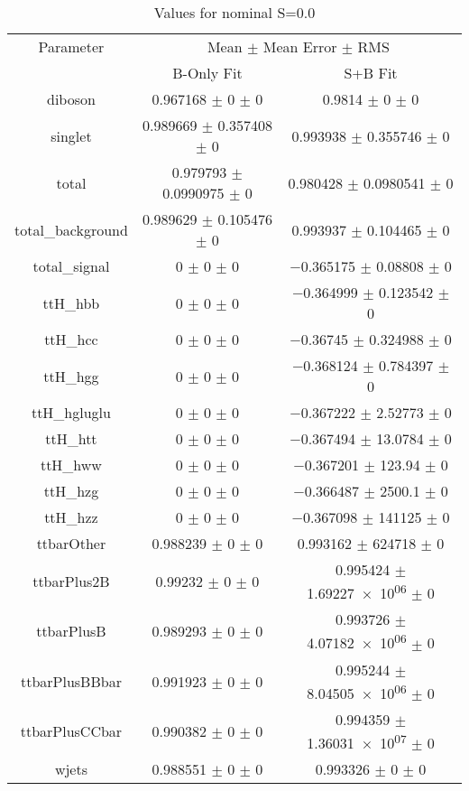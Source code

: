 \begin{table}
\centering
\caption{Values for nominal S=0.0}
\begin{tabular}{ccc}
\toprule
Parameter & \multicolumn{2}{c}{Mean $\pm$ Mean Error $\pm$ RMS}\\
 & B-Only Fit & S+B Fit\\
\midrule
diboson & \num{0.967168} $\pm$ \num{0} $\pm$ \num{0} & \num{0.9814} $\pm$ \num{0} $\pm$ \num{0}\\
singlet & \num{0.989669} $\pm$ \num{0.357408} $\pm$ \num{0} & \num{0.993938} $\pm$ \num{0.355746} $\pm$ \num{0}\\
total & \num{0.979793} $\pm$ \num{0.0990975} $\pm$ \num{0} & \num{0.980428} $\pm$ \num{0.0980541} $\pm$ \num{0}\\
total\_background & \num{0.989629} $\pm$ \num{0.105476} $\pm$ \num{0} & \num{0.993937} $\pm$ \num{0.104465} $\pm$ \num{0}\\
total\_signal & \num{0} $\pm$ \num{0} $\pm$ \num{0} & \num{-0.365175} $\pm$ \num{0.08808} $\pm$ \num{0}\\
ttH\_hbb & \num{0} $\pm$ \num{0} $\pm$ \num{0} & \num{-0.364999} $\pm$ \num{0.123542} $\pm$ \num{0}\\
ttH\_hcc & \num{0} $\pm$ \num{0} $\pm$ \num{0} & \num{-0.36745} $\pm$ \num{0.324988} $\pm$ \num{0}\\
ttH\_hgg & \num{0} $\pm$ \num{0} $\pm$ \num{0} & \num{-0.368124} $\pm$ \num{0.784397} $\pm$ \num{0}\\
ttH\_hgluglu & \num{0} $\pm$ \num{0} $\pm$ \num{0} & \num{-0.367222} $\pm$ \num{2.52773} $\pm$ \num{0}\\
ttH\_htt & \num{0} $\pm$ \num{0} $\pm$ \num{0} & \num{-0.367494} $\pm$ \num{13.0784} $\pm$ \num{0}\\
ttH\_hww & \num{0} $\pm$ \num{0} $\pm$ \num{0} & \num{-0.367201} $\pm$ \num{123.94} $\pm$ \num{0}\\
ttH\_hzg & \num{0} $\pm$ \num{0} $\pm$ \num{0} & \num{-0.366487} $\pm$ \num{2500.1} $\pm$ \num{0}\\
ttH\_hzz & \num{0} $\pm$ \num{0} $\pm$ \num{0} & \num{-0.367098} $\pm$ \num{141125} $\pm$ \num{0}\\
ttbarOther & \num{0.988239} $\pm$ \num{0} $\pm$ \num{0} & \num{0.993162} $\pm$ \num{624718} $\pm$ \num{0}\\
ttbarPlus2B & \num{0.99232} $\pm$ \num{0} $\pm$ \num{0} & \num{0.995424} $\pm$ \num{1.69227e+06} $\pm$ \num{0}\\
ttbarPlusB & \num{0.989293} $\pm$ \num{0} $\pm$ \num{0} & \num{0.993726} $\pm$ \num{4.07182e+06} $\pm$ \num{0}\\
ttbarPlusBBbar & \num{0.991923} $\pm$ \num{0} $\pm$ \num{0} & \num{0.995244} $\pm$ \num{8.04505e+06} $\pm$ \num{0}\\
ttbarPlusCCbar & \num{0.990382} $\pm$ \num{0} $\pm$ \num{0} & \num{0.994359} $\pm$ \num{1.36031e+07} $\pm$ \num{0}\\
wjets & \num{0.988551} $\pm$ \num{0} $\pm$ \num{0} & \num{0.993326} $\pm$ \num{0} $\pm$ \num{0}\\
\bottomrule
\end{tabular}
\end{table}
